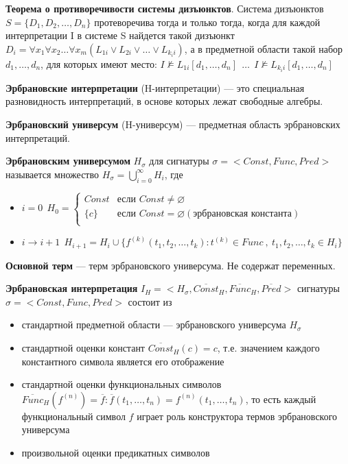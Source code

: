 \documentclass[a4paper,12pt]{article}
\begin{document}

\textbf{Теорема о противоречивости системы дизъюнктов}. Система дизъюнктов $S = \{D_1, D_2, \dots, D_n\}$ протеворечива тогда и только тогда, когда для каждой интерпретации I в системе S найдется такой дизъюнкт $D_i = \forall x_1 \forall x_2 \dots \forall x_m (L_{1i} \vee L_{2i} \vee \dots \vee L_{k_ii})$, а в предметной области такой набор $d_1, \dots, d_n$, для которых имеют место: $I \nvDash L_{1i}[d_1, \dots, d_n] ~~ \dots ~~ I \nvDash L_{k_ii}[d_1, \dots, d_n]$


\textbf{Эрбрановские интерпретации} (H-интерпретации) --- это специальная разновидность интерпретаций, в основе которых лежат свободные алгебры.

\textbf{Эрбрановский универсум} (H-универсум) --- предметная область эрбрановских интерпретаций.

\textbf{Эрбрановским универсумом} $H_\sigma$ для сигнатуры $\sigma = <Const, Func, Pred>$ называется множество $H_\sigma = \bigcup\limits_{i=0}^{\infty}H_i$, где
\begin{itemize}
 \item $i=0 ~~ H_0 =
\begin{cases}
Const	&	\text{если } Const \neq \varnothing \\
\{c\}	&	\text{если } Const = \varnothing (\text{эрбрановская константа})\\
\end{cases}
$
 \item $i \rightarrow i+1 ~~ H_{i+1} = H_i \cup \{f^{(k)}(t_1, t_2, \dots, t_k) : t^{(k)} \in Func ~,~ t_1,t_2,\dots,t_k \in H_i\}$
\end{itemize}

\textbf{Основной терм} --- терм эрбрановского универсума. Не содержат переменных.

\textbf{Эрбрановская интерпретация} $I_H = <H_\sigma, \overline{Const}_H, \overline{Func}_H, \overline{Pred}>$ сигнатуры $\sigma = <Const, Func, Pred>$ состоит из
\begin{itemize}
 \item стандартной предметной области --- эрбрановского универсума $H_\sigma$
 \item стандартной оценки констант $\overline{Const}_H(c) = c$, т.е. значением каждого константного символа является его отображение
 \item стандартной оценки функциональных символов $\overline{Func}_H(f^{(n)}) = \overline{f} : \overline{f}(t_1, \dots, t_n) = f^{(n)}(t_1, \dots, t_n)$, то есть каждый функциональный символ $f$ играет роль конструктора термов эрбрановского универсума
 \item произвольной оценки предикатных символов
\end{itemize}
\end{document}
